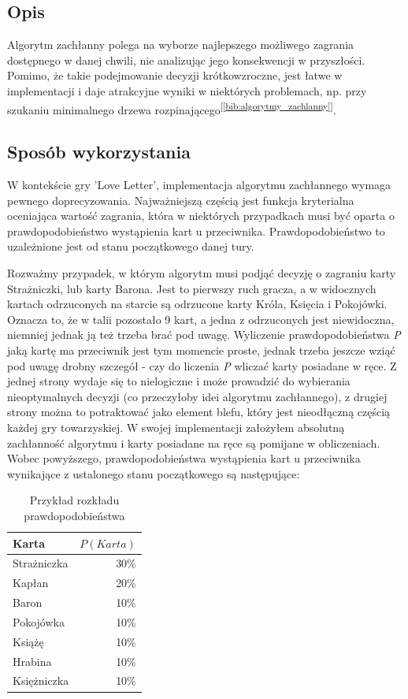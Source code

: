 \subsection{Opis}
Algorytm zachłanny polega na wyborze najlepszego możliwego zagrania dostępnego w danej chwili, nie analizując jego konsekwencji w przyszłości. Pomimo, że takie podejmowanie decyzji krótkowzroczne, jest łatwe w implementacji i daje atrakcyjne wyniki w niektórych problemach, np. przy szukaniu minimalnego drzewa rozpinającego\textsuperscript{[\ref{bib:algorytmy_zachlanny}]}.

\subsection{Sposób wykorzystania}

W kontekście gry 'Love Letter', implementacja algorytmu zachłannego wymaga pewnego doprecyzowania. Najważniejszą częścią jest funkcja kryterialna oceniająca wartość zagrania, która w niektórych przypadkach musi być oparta o prawdopodobieństwo wystąpienia kart u przeciwnika. Prawdopodobieństwo to uzależnione jest od stanu początkowego danej tury.

Rozważmy przypadek, w którym algorytm musi podjąć decyzję o zagraniu karty Strażniczki, lub karty Barona. Jest to pierwszy ruch gracza, a w widocznych kartach odrzuconych na starcie są odrzucone karty Króla, Księcia i Pokojówki. Oznacza to, że w talii pozostało 9 kart, a jedna z odrzuconych jest niewidoczna, niemniej jednak ją też trzeba brać pod uwagę. Wyliczenie prawdopodobieństwa \textit{P} jaką kartę ma przeciwnik jest tym momencie proste, jednak trzeba jeszcze wziąć pod uwagę drobny szczegół - czy do liczenia \textit{P} wliczać karty posiadane w ręce. Z jednej strony wydaje się to nielogiczne i może prowadzić do wybierania nieoptymalnych decyzji (co przeczyłoby idei algorytmu zachłannego), z drugiej strony można to potraktować jako element blefu, który jest nieodłączną częścią każdej gry towarzyskiej. W swojej implementacji założyłem absolutną zachłanność algorytmu i karty posiadane na ręce są pomijane w obliczeniach. 
Wobec powyższego, prawdopodobieństwa wystąpienia kart u przeciwnika wynikające z ustalonego stanu początkowego są następujące:

\begin{table}[h]
	\caption{Przykład rozkładu prawdopodobieństwa}
	\centering
		\begin{tabular}{|l|r|}
			\hline
			\bf{Karta} & $P(Karta)$	\\ \hline
			Strażniczka & 30\% 			\\ \hline
			Kapłan & 20\% 				\\ \hline
			Baron & 10\% 				\\ \hline
			Pokojówka & 10\% 			\\ \hline
			Książę & 10\% 				\\ \hline
			Hrabina & 10\% 				\\ \hline
			Księżniczka & 10\% 			\\ \hline
		\end{tabular}
\end{table}

